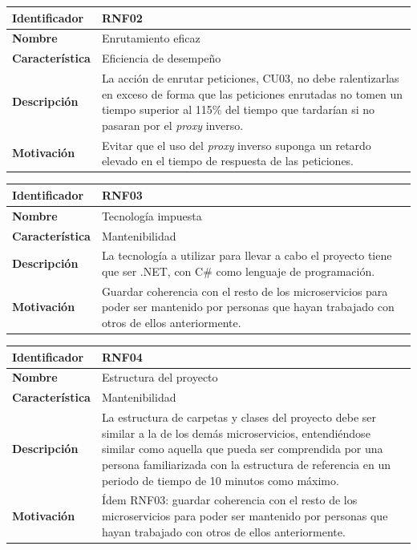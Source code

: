 \documentclass[11pt,spanish,listoffigures]{tfgetsinf}
\begin{document}
\begin{center} \begin{tabular}{| l | p{11.3cm} |}
\hline
\textbf{Identificador} & RNF02
\\ \hline
\textbf{Nombre} & Enrutamiento eficaz
\\ \hline
\textbf{Característica} & Eficiencia de desempeño
\\ \hline
\textbf{Descripción} & La acción de enrutar peticiones, CU03, no debe ralentizarlas en exceso de forma que las peticiones enrutadas no tomen un tiempo superior al 115\% del tiempo que tardarían si no pasaran por el \emph{proxy} inverso.
\\ \hline
\textbf{Motivación} & Evitar que el uso del \emph{proxy} inverso suponga un retardo elevado en el tiempo de respuesta de las peticiones.
\\ \hline \end{tabular} \end{center}

\begin{center} \begin{tabular}{| l | p{11.3cm} |}
\hline
\textbf{Identificador} & RNF03
\\ \hline
\textbf{Nombre} & Tecnología impuesta
\\ \hline
\textbf{Característica} & Mantenibilidad
\\ \hline
\textbf{Descripción} & La tecnología a utilizar para llevar a cabo el proyecto tiene que ser .NET, con C\# como lenguaje de programación.
\\ \hline
\textbf{Motivación} & Guardar coherencia con el resto de los microservicios para poder ser mantenido por personas que hayan trabajado con otros de ellos anteriormente.
\\ \hline \end{tabular} \end{center}

\begin{center} \begin{tabular}{| l | p{11.3cm} |}
\hline
\textbf{Identificador} & RNF04
\\ \hline
\textbf{Nombre} & Estructura del proyecto
\\ \hline
\textbf{Característica} & Mantenibilidad
\\ \hline
\textbf{Descripción} & La estructura de carpetas y clases del proyecto debe ser similar a la de los demás microservicios, entendiéndose similar como aquella que pueda ser comprendida por una persona familiarizada con la estructura de referencia en un periodo de tiempo de 10 minutos como máximo.
\\ \hline
\textbf{Motivación} & Ídem RNF03: guardar coherencia con el resto de los microservicios para poder ser mantenido por personas que hayan trabajado con otros de ellos anteriormente.
\\ \hline \end{tabular} \end{center}
\end{document}
